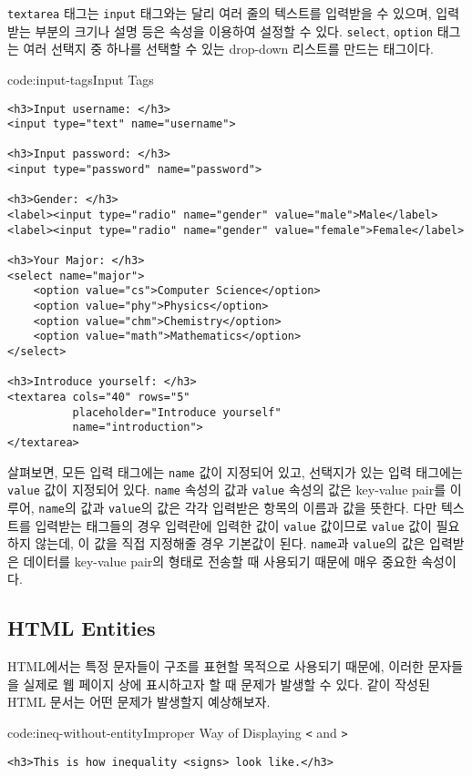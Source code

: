\texttt{textarea} 태그는 \texttt{input} 태그와는 달리 여러 줄의 텍스트를 입력받을 수 있으며, 입력받는 부분의 크기나 설명 등은 속성을 이용하여 설정할 수 있다. \texttt{select}, \texttt{option} 태그는 여러 선택지 중 하나를 선택할 수 있는 drop-down 리스트를 만드는 태그이다. 

\begin{codeenv}{code:input-tags}{Input Tags}\begin{verbatim}
<h3>Input username: </h3>
<input type="text" name="username">

<h3>Input password: </h3>
<input type="password" name="password">

<h3>Gender: </h3>
<label><input type="radio" name="gender" value="male">Male</label>
<label><input type="radio" name="gender" value="female">Female</label>

<h3>Your Major: </h3>
<select name="major">
    <option value="cs">Computer Science</option>
    <option value="phy">Physics</option>
    <option value="chm">Chemistry</option>
    <option value="math">Mathematics</option>
</select>

<h3>Introduce yourself: </h3>
<textarea cols="40" rows="5"
          placeholder="Introduce yourself"
          name="introduction">
</textarea>
\end{verbatim}
\end{codeenv}

\를 살펴보면, 모든 입력 태그에는 \texttt{name} 값이 지정되어 있고, 선택지가 있는 입력 태그에는 \texttt{value} 값이 지정되어 있다. \texttt{name} 속성의 값과 \texttt{value} 속성의 값은 key-value pair를 이루어, \texttt{name}의 값과 \texttt{value}의 값은 각각 입력받은 항목의 이름과 값을 뜻한다. 다만 텍스트를 입력받는 태그들의 경우 입력란에 입력한 값이 \texttt{value} 값이므로 \texttt{value} 값이 필요하지 않는데, 이 값을 직접 지정해줄 경우 기본값이 된다. \texttt{name}과 \texttt{value}의 값은 입력받은 데이터를 key-value pair의 형태로 전송할 때 사용되기 때문에 매우 중요한 속성이다.

\subsection*{HTML Entities}

HTML에서는 특정 문자들이 구조를 표현할 목적으로 사용되기 때문에, 이러한 문자들을 실제로 웹 페이지 상에 표시하고자 할 때 문제가 발생할 수 있다. \와 같이 작성된 HTML 문서는 어떤 문제가 발생할지 예상해보자. 

\begin{codeenv}{code:ineq-without-entity}{Improper Way of Displaying \texttt{<} and \texttt{>}}\begin{verbatim}
<h3>This is how inequality <signs> look like.</h3>
\end{verbatim}
\end{codeenv}


